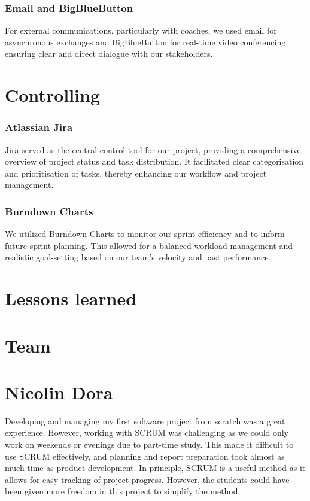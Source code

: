 \subsubsection{Email and BigBlueButton}
For external communications, particularly with coaches, we used email for asynchronous exchanges and BigBlueButton for real-time video conferencing, ensuring clear and direct dialogue with our stakeholders.

\section{Controlling}

\subsubsection{Atlassian Jira}
Jira served as the central control tool for our project, providing a comprehensive overview of project status and task distribution.
It facilitated clear categorisation and prioritisation of tasks, thereby enhancing our workflow and project management.

\subsubsection{Burndown Charts}
We utilized Burndown Charts to monitor our sprint efficiency and to inform future sprint planning.
This allowed for a balanced workload management and realistic goal-setting based on our team's velocity and past performance.


\section{Lessons learned}


\section{Team}

\section{Nicolin Dora}
Developing and managing my first software project from scratch was a great experience.
However, working with SCRUM was challenging as we could only work on weekends or evenings due to part-time study.
This made it difficult to use SCRUM effectively, and planning and report preparation took almost as much time as product development.
In principle, SCRUM is a useful method as it allows for easy tracking of project progress.
However, the students could have been given more freedom in this project to simplify the method.

